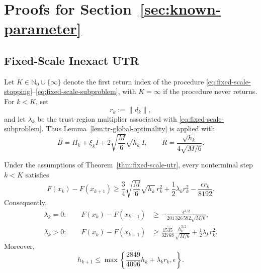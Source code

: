 \section{Proofs for Section~\ref{sec:known-parameter}}
\label{app:known-parameter}


\subsection{Fixed-Scale Inexact UTR}
\label{app:fixed-scale-proofs}

Let $K\in\mathbb{N}_0\cup\{\infty\}$ denote the first return index of
the procedure
\eqref{eq:fixed-scale-stopping}--\eqref{eq:fixed-scale-subproblem},
with $K=\infty$ if the procedure never returns.
For $k<K$, set
\[
    r_k:=\|d_k\|,
\]
and let $\lambda_k$ be the trust-region multiplier associated with
\eqref{eq:fixed-scale-subproblem}.
Thus Lemma~\ref{lem:tr-global-optimality} is applied with
\[
    B
    =
    H_k+\xi_kI
    +2\sqrt{\frac M6}\sqrt{h_k}\,I,
    \qquad
    R
    =
    \frac{\sqrt{h_k}}{4\sqrt{M/6}}.
\]


\begin{lemma}
\label{lem:fixed-one-step}
Under the assumptions of Theorem~\ref{thm:fixed-scale-utr},
every nonterminal step $k<K$ satisfies
\begin{equation}
    F(x_k)-F(x_{k+1})
    \ge
    \frac34
    \sqrt{\frac M6}\sqrt{h_k}\,r_k^2
    +
    \frac12\lambda_kr_k^2
    -
    \frac{\epsilon r_k}{8192}.
    \label{eq:fixed-basic-decrease}
\end{equation}
Consequently,
\begin{subequations}
\label{eq:fixed-step-type-decrease}
\begin{align}
    \lambda_k=0:\qquad
    F(x_k)-F(x_{k+1})
    &\ge
    -
    \frac{
        \epsilon^{3/2}
    }{
        201\,326\,592\sqrt{M/6}
    },
    \label{eq:fixed-interior-increase}
    \\
    \lambda_k>0:\qquad
    F(x_k)-F(x_{k+1})
    &\ge
    \frac{1535}{32768}
    \frac{h_k^{3/2}}{\sqrt{M/6}}
    +
    \frac12\lambda_kr_k^2.
    \label{eq:fixed-boundary-decrease}
\end{align}
\end{subequations}
Moreover,
\begin{equation}
    h_{k+1}
    \le
    \max\left\{
        \frac{2849}{4096}h_k
        +
        \lambda_kr_k,
        \epsilon
    \right\}.
    \label{eq:fixed-gradient-recurrence}
\end{equation}
\end{lemma}

